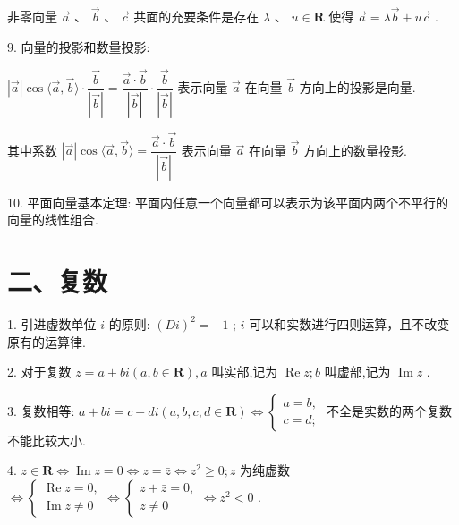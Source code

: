   非零向量 $\overrightarrow{a}$ 、 $\overrightarrow{b}$ 、 $\overrightarrow{c}$ 共面的充要条件是存在 $\lambda$ 、 $u \in  \mathbf{R}$ 使得 $\overrightarrow{a} = \lambda \overrightarrow{b} + u\overrightarrow{c}$ .

9. 向量的投影和数量投影:

$\left| \overrightarrow{a}\right| \cos \langle \overrightarrow{a},\overrightarrow{b}\rangle  \cdot  \dfrac{\overrightarrow{b}}{\left| \overrightarrow{b}\right| } = \dfrac{\overrightarrow{a} \cdot  \overrightarrow{b}}{\left| \overrightarrow{b}\right| } \cdot  \dfrac{\overrightarrow{b}}{\left| \overrightarrow{b}\right| }$ 表示向量 $\overrightarrow{a}$ 在向量 $\overrightarrow{b}$ 方向上的投影是向量.

其中系数 $\left| \overrightarrow{a}\right| \cos \langle \overrightarrow{a},\overrightarrow{b}\rangle  = \dfrac{\overrightarrow{a} \cdot  \overrightarrow{b}}{\left| \overrightarrow{b}\right| }$ 表示向量 $\overrightarrow{a}$ 在向量 $\overrightarrow{b}$ 方向上的数量投影.

10. 平面向量基本定理: 平面内任意一个向量都可以表示为该平面内两个不平行的向量的线性组合.

\section*{二、复数}

1. 引进虚数单位 ${i}$ 的原则: ${\left( {D}{i}\right) }^{2} =  - 1$ ;    ${i}$ 可以和实数进行四则运算，且不改变原有的运算律.

2. 对于复数 $z = a + b{i}\left( {a,b \in  \mathbf{R}}\right) ,a$ 叫实部,记为 $\operatorname{Re}z;b$ 叫虚部,记为 $\operatorname{Im}z$ .

3. 复数相等: $a + b{i} = c + d{i}\left( {a,b,c,d \in  \mathbf{R}}\right)  \Leftrightarrow  \left\{  \begin{array}{l} a = b, \\  c = d; \end{array}\right.$ 不全是实数的两个复数不能比较大小.

4. $z \in  \mathbf{R} \Leftrightarrow  \operatorname{Im}z = 0 \Leftrightarrow  z = \bar{z} \Leftrightarrow  {z}^{2} \geq  0;z$ 为纯虚数 $\Leftrightarrow  \left\{  {\begin{array}{l} \operatorname{Re}z = 0, \\  \operatorname{Im}z \neq  0 \end{array} \Leftrightarrow  \left\{  {\begin{array}{l} z + \bar{z} = 0, \\  z \neq  0 \end{array} \Leftrightarrow  {z}^{2} < 0}\right. }\right.$ .



